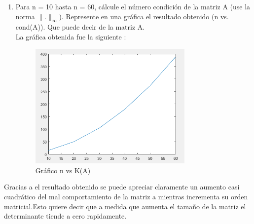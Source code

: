 \documentclass{udpreport}
\providecommand{\norm}[1]{\lVert#1\rVert}
\begin{document}
\begin{enumerate}
\begin{enumerate}
\begin{align*}
1.5863\\ 1.5536\\ 1.5207\\ 1.4604\\ 1.3791\\ 1.3247\\ 1.1986\\ 0.9740\\ 0.9136\\ 0.7067 \end{array}\right) 
 	        \end{align*}
	        
 	        \item Para n = 10 hasta n = 60, cálcule el número condición de la matriz A (use la norma $\norm{.}_{\infty}$). Represente en una gráfica el resultado obtenido (n vs. cond(A)). Que puede decir de la matriz A.\\
 	        
 	        La gráfica obtenida fue la siguiente :
            \begin{figure}[H]
                \centering
                \includegraphics[width=8cm]{Grafico2b}
                \caption{Gráfico n vs K(A)} \label{fig:Grafico2b}
            \end{figure}
       \end{enumerate}     
            Gracias a el resultado obtenido se puede apreciar claramente un aumento casi cuadrático del mal comportamiento de la matriz a mientras incrementa su orden matricial.Esto quiere decir que a medida que aumenta el tamaño de la matriz el determinante tiende a cero rapidamente.\\
            

\end{enumerate}
\end{document}
